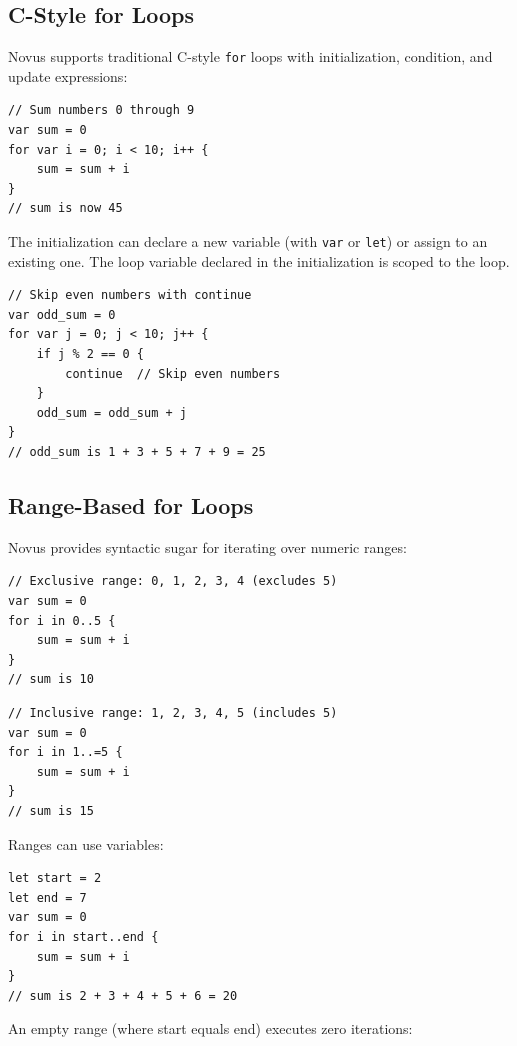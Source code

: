 \subsection{C-Style for Loops}
\label{subsec:for-cstyle}

Novus supports traditional C-style \texttt{for} loops with initialization, condition, and update expressions:

\begin{lstlisting}
// Sum numbers 0 through 9
var sum = 0
for var i = 0; i < 10; i++ {
    sum = sum + i
}
// sum is now 45
\end{lstlisting}

The initialization can declare a new variable (with \texttt{var} or \texttt{let}) or assign to an existing one. The loop variable declared in the initialization is scoped to the loop.

\begin{lstlisting}
// Skip even numbers with continue
var odd_sum = 0
for var j = 0; j < 10; j++ {
    if j % 2 == 0 {
        continue  // Skip even numbers
    }
    odd_sum = odd_sum + j
}
// odd_sum is 1 + 3 + 5 + 7 + 9 = 25
\end{lstlisting}

\subsection{Range-Based for Loops}
\label{subsec:for-range}

Novus provides syntactic sugar for iterating over numeric ranges:

\begin{lstlisting}
// Exclusive range: 0, 1, 2, 3, 4 (excludes 5)
var sum = 0
for i in 0..5 {
    sum = sum + i
}
// sum is 10
\end{lstlisting}

\begin{lstlisting}
// Inclusive range: 1, 2, 3, 4, 5 (includes 5)
var sum = 0
for i in 1..=5 {
    sum = sum + i
}
// sum is 15
\end{lstlisting}

Ranges can use variables:

\begin{lstlisting}
let start = 2
let end = 7
var sum = 0
for i in start..end {
    sum = sum + i
}
// sum is 2 + 3 + 4 + 5 + 6 = 20
\end{lstlisting}

An empty range (where start equals end) executes zero iterations:

